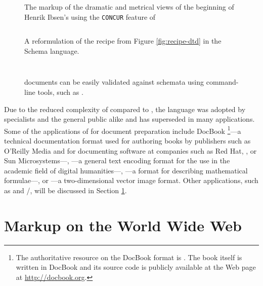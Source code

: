 \documentclass{book}
\begin{document}
\begin{figure}[hb!]
  
  \caption{The markup of the dramatic and metrical views of the beginning of
    Henrik Ibsen's  using the \texttt{CONCUR} feature of
    }
\end{figure}


\begin{figure}[H]
  \inputminted{xml}{examples/02/recipe.xsd}
  \caption{A reformulation of the recipe  from Figure
    \ref{fig:recipe-dtd} in the  Schema 
    language.}
  \label{fig:recipe-xsd}
  \inputminted{text}{examples/02/recipe.rnc}
  \caption{A reformulation of the recipe  from Figure
    \ref{fig:recipe-dtd} in the compact syntax of .%
    }
  \label{fig:recipe-rnc}
  \inputminted{sh}{examples/02/recipe.sh}
  \caption{ documents can be easily validated against 
    schemata using command-line tools, such as .}
\end{figure}

Due to the reduced complexity of  compared to , the
language was adopted by specialists and the general public alike and has
superseded  in many applications. Some of the applications of
 for document preparation include DocBook%
\footnote{
  The authoritative resource on the DocBook  format is
  \cite{walsh10}. The book itself is written in DocBook and its source code is
  publicly available at the Web page at \url{http://docbook.org}.
}---a technical documentation format used for authoring books by publishers such
as O'Reilly Media and for documenting software at companies such as Red Hat,
, or Sun Microsystems---, ---a general text encoding
format for the use in the academic field of digital humanities---,
---a format for describing mathematical formulae---, or
---a two-dimensional vector image format. Other 
applications, such as  and /, will
be discussed in Section \ref{sec:www-markup}.
      
\section{Markup on the World Wide Web}\label{sec:www-markup}
\end{document}
